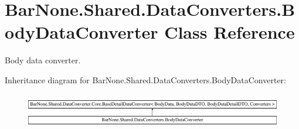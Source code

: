 \hypertarget{class_bar_none_1_1_shared_1_1_data_converters_1_1_body_data_converter}{}\section{Bar\+None.\+Shared.\+Data\+Converters.\+Body\+Data\+Converter Class Reference}
\label{class_bar_none_1_1_shared_1_1_data_converters_1_1_body_data_converter}


Body data converter.  


Inheritance diagram for Bar\+None.\+Shared.\+Data\+Converters.\+Body\+Data\+Converter\+:\begin{figure}[H]
\begin{center}
\leavevmode
\includegraphics[height=1.505376cm]{class_bar_none_1_1_shared_1_1_data_converters_1_1_body_data_converter}
\end{center}
\end{figure}
